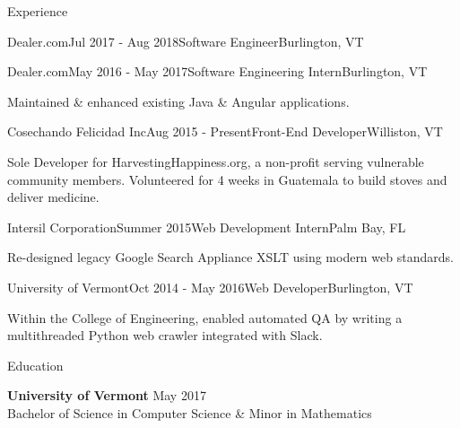 \documentclass{resume} %
\begin{document}
\begin{rSection}{Experience}
\begin{rSubsection}{Dealer.com}{Jul 2017 - Aug 2018}{Software Engineer}{Burlington, VT}
\end{rSubsection}

\begin{rSubsection}{Dealer.com}{May 2016 - May 2017}{Software Engineering Intern}{Burlington, VT}

Maintained \& enhanced existing Java \& Angular applications.

\end{rSubsection}


\begin{rSubsection}{Cosechando Felicidad Inc}{Aug 2015 - Present}{Front-End Developer}{Williston, VT}

Sole Developer for HarvestingHappiness.org, a non-profit serving vulnerable community members.
Volunteered for 4 weeks in Guatemala to build stoves and deliver medicine.

\end{rSubsection}


\begin{rSubsection}{Intersil Corporation}{Summer 2015}{Web Development Intern}{Palm Bay, FL}

Re-designed legacy Google Search Appliance XSLT using modern web standards.

\end{rSubsection}


\begin{rSubsection}{University of Vermont}{Oct 2014 - May 2016}{Web Developer}{Burlington, VT}

Within the College of Engineering, enabled automated QA by writing a multithreaded Python web
crawler integrated with Slack.

\end{rSubsection}

\end{rSection}


\begin{rSection}{Education}

{\bf University of Vermont} \hfill {May 2017} \\
Bachelor of Science in Computer Science \& Minor in Mathematics

\end{rSection}
\end{document}

